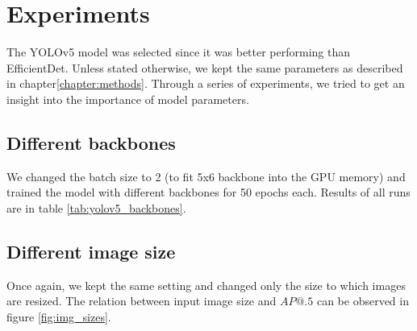 \section{Experiments}
The YOLOv5 model was selected since it was better performing than EfficientDet. Unless stated otherwise, we kept the same parameters as described in chapter\ref{chapter:methods}. Through a series of experiments, we tried to get an insight into the importance of model parameters.
\subsection{Different backbones}
We changed the batch size to 2 (to fit 5x6 backbone into the GPU memory) and trained the model with different backbones for 50 epochs each. Results of all runs are in table \ref{tab:yolov5_backbones}.


\subsection{Different image size}
Once again, we kept the same setting and changed only the size to which images are resized. The relation between input image size and $AP@.5$ can be observed in figure \ref{fig:img_sizes}.

